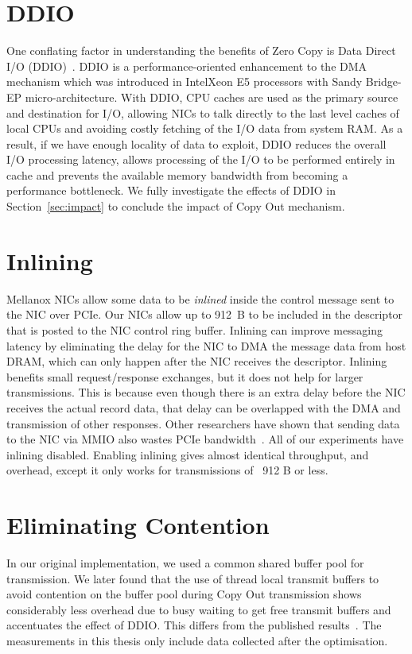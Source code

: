 \section{DDIO}
One conflating factor in understanding the benefits of Zero Copy is Data Direct I/O (DDIO)~\cite{ddio}.
 DDIO is a performance-oriented enhancement to the DMA mechanism which was introduced in Intel\textregistered Xeon E5 processors with Sandy Bridge-EP micro-architecture.
 With DDIO, CPU caches are used as the primary source and destination for I/O, 
allowing NICs to talk directly to the last level caches of local CPUs
and avoiding costly fetching of the I/O data from system RAM. As a result, if we have enough locality of data to exploit,
DDIO reduces the overall I/O processing latency, allows processing of the I/O 
to be performed entirely in cache and prevents the available memory bandwidth from becoming a performance bottleneck.
We fully investigate the effects of DDIO in Section~\ref{sec:impact} to conclude the impact of 
Copy Out mechanism.


\section{Inlining}
Mellanox NICs allow some data to be {\em inlined} inside the control message
sent to the NIC over PCIe. Our NICs allow up to 912~B to be included in the
descriptor that is posted to the NIC control ring buffer.  Inlining can improve
messaging latency by eliminating the delay for the NIC to DMA the message data
from host DRAM, which can only happen after the NIC receives the descriptor.
Inlining benefits small request/response exchanges, but it does not help for
larger transmissions. This is because even though there is an extra delay
before the NIC receives the actual record data, that delay can be overlapped
with the DMA and transmission of other responses. Other researchers have shown
that sending data to the NIC via MMIO also wastes PCIe bandwidth~\cite{rdma}.
All of our experiments have inlining disabled. Enabling inlining gives almost 
identical throughput, and overhead, except it only works for transmissions of ~912 B or less.

\section{Eliminating Contention}
\label{sec:code-optimisation}
In our original implementation, we used a common shared buffer pool for transmission.
We later found that the use of thread local transmit buffers to avoid contention on the buffer pool during 
Copy Out transmission shows considerably less overhead due to busy waiting to get free transmit buffers 
and accentuates the effect of DDIO. This differs from the published results~\cite{imdmpaper}. 
The measurements in this thesis only include data collected after the optimisation.

